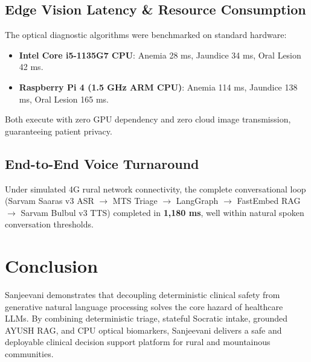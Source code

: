 \documentclass[conference]{IEEEtran}
\begin{document}
\subsection{Edge Vision Latency \& Resource Consumption}
The optical diagnostic algorithms were benchmarked on standard hardware:
\begin{itemize}
    \item \textbf{Intel Core i5-1135G7 CPU}: Anemia 28 ms, Jaundice 34 ms, Oral Lesion 42 ms.
    \item \textbf{Raspberry Pi 4 (1.5 GHz ARM CPU)}: Anemia 114 ms, Jaundice 138 ms, Oral Lesion 165 ms.
\end{itemize}
Both execute with zero GPU dependency and zero cloud image transmission, guaranteeing patient privacy.

\subsection{End-to-End Voice Turnaround}
Under simulated 4G rural network connectivity, the complete conversational loop (Sarvam Saaras v3 ASR $\rightarrow$ MTS Triage $\rightarrow$ LangGraph $\rightarrow$ FastEmbed RAG $\rightarrow$ Sarvam Bulbul v3 TTS) completed in \textbf{1,180 ms}, well within natural spoken conversation thresholds.

\section{Conclusion}
Sanjeevani demonstrates that decoupling deterministic clinical safety from generative natural language processing solves the core hazard of healthcare LLMs. By combining deterministic triage, stateful Socratic intake, grounded AYUSH RAG, and CPU optical biomarkers, Sanjeevani delivers a safe and deployable clinical decision support platform for rural and mountainous communities.
\end{document}

